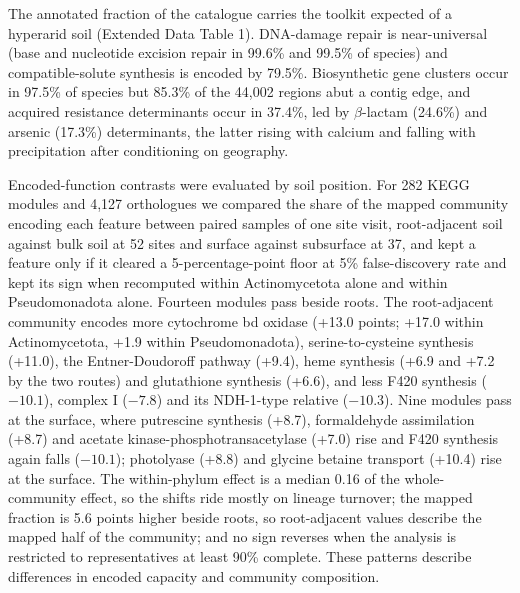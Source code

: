 \documentclass[11pt]{article}
\begin{document}
The annotated fraction of the catalogue carries the toolkit expected of a hyperarid soil (Extended
Data Table 1).
DNA-damage repair
is near-universal (base and nucleotide excision repair in 99.6\% and 99.5\% of species) and
compatible-solute synthesis is encoded by 79.5\%. Biosynthetic gene clusters occur in 97.5\% of
species but 85.3\% of the 44{,}002 regions abut a contig edge, and acquired resistance determinants
occur in 37.4\%, led by $\beta$-lactam (24.6\%) and arsenic (17.3\%) determinants, the latter rising
with calcium and falling with precipitation after conditioning on geography.

Encoded-function contrasts were evaluated by soil position. For 282 KEGG modules and 4{,}127
orthologues we compared the share of the mapped community encoding each feature between paired
samples of one site visit, root-adjacent soil against bulk soil at 52 sites and surface against
subsurface at 37, and kept a feature only if it cleared a 5-percentage-point floor at 5\%
false-discovery rate and kept its sign when recomputed within Actinomycetota alone and within
Pseudomonadota alone. Fourteen modules pass beside roots. The root-adjacent community encodes more
cytochrome bd oxidase (+13.0 points; +17.0 within Actinomycetota, +1.9 within Pseudomonadota),
serine-to-cysteine synthesis (+11.0), the Entner-Doudoroff pathway (+9.4), heme synthesis (+6.9 and
+7.2 by the two routes) and glutathione synthesis (+6.6), and less F420 synthesis ($-10.1$), complex I
($-7.8$) and its NDH-1-type relative ($-10.3$).
Nine modules pass at
the surface, where putrescine synthesis (+8.7), formaldehyde assimilation (+8.7) and acetate
kinase-phosphotransacetylase (+7.0) rise and F420 synthesis again falls ($-10.1$); photolyase
(+8.8) and glycine betaine transport (+10.4) rise at the surface. The within-phylum effect is a
median 0.16 of the whole-community effect, so the shifts ride mostly on lineage turnover; the mapped
fraction is 5.6 points higher beside roots, so root-adjacent values describe the mapped half of the
community; and no sign reverses when the analysis is restricted to representatives at least 90\%
complete. These patterns describe differences in encoded capacity and community composition.
\end{document}
